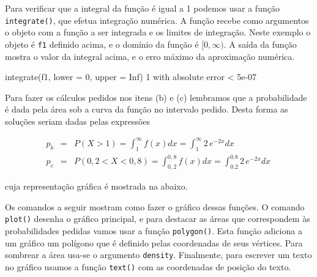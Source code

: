\documentclass[
  10pt,
  a4paper]{book}
\newenvironment{Shaded}{\begin{snugshade}}{\end{snugshade}}
\newcommand{\AttributeTok}[1]{\textcolor[rgb]{0.77,0.63,0.00}{#1}}
\newcommand{\ConstantTok}[1]{\textcolor[rgb]{0.00,0.00,0.00}{#1}}
\newcommand{\DecValTok}[1]{\textcolor[rgb]{0.00,0.00,0.81}{#1}}
\newcommand{\FloatTok}[1]{\textcolor[rgb]{0.00,0.00,0.81}{#1}}
\newcommand{\FunctionTok}[1]{\textcolor[rgb]{0.00,0.00,0.00}{#1}}
\newcommand{\NormalTok}[1]{#1}
\newcommand{\SpecialCharTok}[1]{\textcolor[rgb]{0.00,0.00,0.00}{#1}}
\begin{document}
Para verificar que a integral da função é igual a 1 podemos usar a
função \texttt{integrate()}, que efetua integração numérica. A função recebe
como argumentos o objeto com a função a ser integrada e os limites de
integração. Neste exemplo o objeto é \texttt{f1} definido acima, e o domínio da
função é \([0, \infty)\). A saída da função mostra o valor da integral
acima, e o erro máximo da aproximação numérica.

\begin{Shaded}
\begin{Highlighting}[]
\FunctionTok{integrate}\NormalTok{(f1, }\AttributeTok{lower =} \DecValTok{0}\NormalTok{, }\AttributeTok{upper =} \ConstantTok{Inf}\NormalTok{)}
\DecValTok{1}\NormalTok{ with absolute error }\SpecialCharTok{\textless{}} \FloatTok{5e{-}07}
\end{Highlighting}
\end{Shaded}

Para fazer os cálculos pedidos nos itens (b) e (c) lembramos que a
probabilidade é dada pela área sob a curva da função no intervalo
pedido. Desta forma as soluções seriam dadas pelas expressões

\begin{eqnarray*}
 p_b & = & P(X > 1) = \int_1^\infty f(x) dx = \int_1^\infty 2\,e^{-2x} dx \\
 p_c & = & P(0,2 < X < 0,8) = \int_{0,2}^{0,8} f(x) dx = \int_{0.2}^{0.8} 2\,e^{-2x} dx \,
\end{eqnarray*}

cuja representação gráfica é mostrada na abaixo.

Os comandos a seguir mostram como fazer o gráfico dessas funções. O
comando \texttt{plot()} desenha o gráfico principal, e para destacar as
áreas que correspondem às probabilidades pedidas vamos usar a função
\texttt{polygon()}. Esta função adiciona a um gráfico um polígono que é
definido pelas coordenadas de seus vértices. Para sombrear a área usa-se
o argumento \texttt{density}. Finalmente, para escrever um texto no gráfico
usamos a função \texttt{text()} com as coordenadas de posição do texto.
\end{document}
